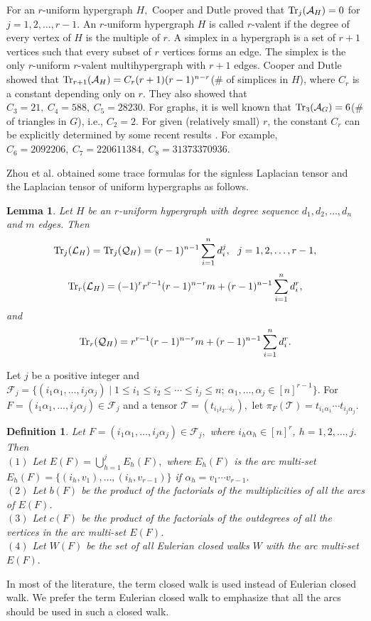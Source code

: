\documentclass[11pt]{article}
\newtheorem{definition}[theorem]{Definition}
\newtheorem{lemma}[theorem]{Lemma}
\def\Tr{\mathop{\rm Tr }\nolimits}
\begin{document}
For an $r$-uniform hypergraph $H,$ Cooper and Dutle \cite{CoDu} proved that $\Tr_{j}(\mathcal{A}_{H})=0$ for $j=1,2,\ldots,r-1.$ An $r$-uniform hypergraph $H$ is called $r$-valent if the degree of every vertex of $H$ is the multiple of $r.$ A simplex in a hypergraph is a set of $r+1$ vertices such that every subset of $r$ vertices forms an edge. The simplex is the only $r$-uniform $r$-valent multihypergraph with $r+1$ edges. Cooper and Dutle \cite{CoDu} showed that $\Tr_{r+1}(\mathcal{A}_{H})=C_{r}(r+1)(r-1)^{n-r}$(\# of simplices in $H$), where $C_{r}$ is a constant depending only on $r.$ They also showed that $C_{3}=21,~C_{4}=588,~C_{5}=28230.$ For graphs, it is well known \cite{Bi} that $\Tr_{3}(\mathcal{A}_{G})=6$(\# of triangles in $G$), i.e., $C_{2}=2.$ For given (relatively small) $r$, the constant $C_{r}$ can be explicitly determined by some recent results \cite{CC}. For example, $C_{6}=2092206,~C_{7}= 220611384,~C_{8}= 31373370936.$

Zhou et al. \cite{ZSWB} obtained some trace formulas for the signless Laplacian tensor and the Laplacian tensor of uniform hypergraphs as follows.
\noindent\begin{lemma}\label{le:3-1}\cite{ZSWB}
Let $H$ be an $r$-uniform hypergraph with degree sequence $d_{1}, d_{2}, \ldots,d_{n}$ and $m$ edges. Then
$$\Tr_{j}(\mathcal{L}_{H})=\Tr_{j}(\mathcal{Q}_{H})=(r-1)^{n-1}\sum_{i=1}^{n}d_{i}^{j},~~j=1,2,\ldots,r-1,$$
$$\Tr_{r}(\mathcal{L}_{H})=(-1)^{r}r^{r-1}(r-1)^{n-r}m+(r-1)^{n-1}\sum_{i=1}^{n}d_{i}^{r},$$ and
$$\Tr_{r}(\mathcal{Q}_{H})=r^{r-1}(r-1)^{n-r}m+(r-1)^{n-1}\sum_{i=1}^{n}d_{i}^{r}.$$
\end{lemma}

Let $j$ be a positive integer and $\mathcal{F}_{j}=\{(i_{1}\alpha_{1},\ldots,i_{j}\alpha_{j}) \mid 1 \leq i_{1} \leq i_{2} \leq\cdots \leq i_{j}\leq n;~\alpha_{1}, \ldots, \alpha_{j}\in [n]^{r-1}\}.$ For $F=(i_{1}\alpha_{1},\ldots,i_{j}\alpha_{j})\in \mathcal{F}_{j}$ and a tensor $\mathcal{T}=(t_{i_{1}i_{2}\cdots i_{r}}),$ let $\pi_{F}(\mathcal{T})=t_{i_{1}\alpha_{1}}\cdots t_{i_{j}\alpha_{j}}.$
\noindent\begin{definition}\label{de:3-1} \cite{SQH}
Let $F=(i_{1}\alpha_{1},\ldots,i_{j}\alpha_{j})\in \mathcal{F}_{j},$ where $i_{h}\alpha_{h}\in [n]^{r}$, $h=1,2, \ldots, j.$ Then
\\$(1)$ Let $E(F)=\bigcup\limits_{h=1}^{j}E_{h}(F),$ where $E_{h}(F)$ is the arc multi-set $E_{h}(F)=\{ (i_{h},v_{1}), \ldots, (i_{h},v_{r-1}) \}$ if $\alpha_{h}=v_{1}\cdots v_{r-1}.$
\\$(2)$ Let $b(F)$ be the product of the factorials of the multiplicities of all the arcs of $E(F)$.
\\$(3)$ Let $c(F)$ be the product of the factorials of the outdegrees of all the vertices in the arc multi-set $E(F)$.
\\$(4)$ Let $W(F)$ be the set of all Eulerian closed walks $W$ with the arc multi-set $E(F).$
\end{definition}
In most of the literature, the term closed walk is used instead of Eulerian closed walk. We prefer the term Eulerian closed walk to emphasize that all the arcs should be used in such a closed walk.
\end{document}
